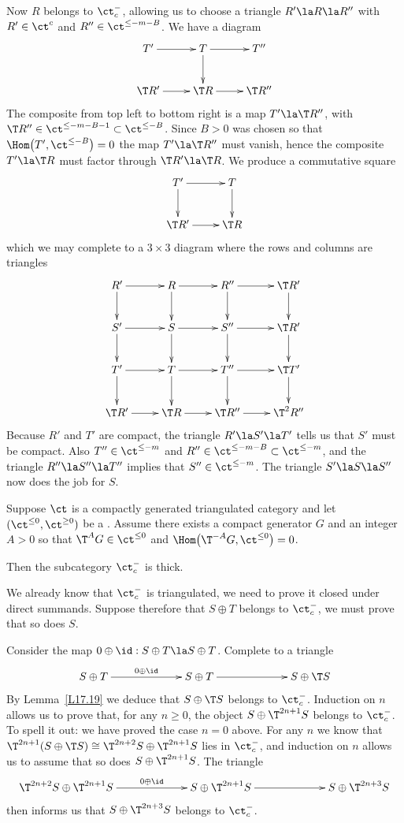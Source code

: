 \documentclass[11pt]{amsart}
\begin{document}
Now $R$ belongs to $\ct^-_c$, allowing us to choose a triangle $R'\la
R\la R''$ with 
$R'\in\ct^c$ and $R''\in\ct^{\leq-m-B}$. We have a diagram
\[\xymatrix{
T'\ar[r] & T\ar[r] \ar[d] & T'' \\
\T R' \ar[r] & \T R\ar[r]  &\T R''
}\]
The composite from top left to bottom right is a map $T'\la \T R''$,
with $\T R''\in\ct^{\leq-m-B-1}\subset\ct^{\leq-B}$. Since
$B>0$ was chosen so that $\Hom\big(T',\ct^{\leq-B}\big)=0$ the map
$T'\la\T R''$ must vanish, hence the composite $T'\la \T R$ must factor
through $\T R'\la\T R$. We produce a commutative
square
\[\xymatrix{
T'\ar[r]\ar[d] & T \ar[d] \\
\T R' \ar[r] & \T R
}\]
which we may complete to a $3\times3$ diagram where the rows and
columns are triangles
\[\xymatrix{
R' \ar[r] \ar[d] & R\ar[r]  \ar[d] & R''\ar[r] \ar[d] &\T R' \ar[d] \\
S' \ar[r] \ar[d] & S\ar[r]  \ar[d] & S''\ar[r] \ar[d] &\T R' \ar[d] \\
T'\ar[r] \ar[d] & T\ar[r] \ar[d] & T'' \ar[r]\ar[d]  &\T T' \ar[d] \\
\T R' \ar[r] & \T R\ar[r]  &\T R''\ar[r]  &\T^2 R''
}\]
Because $R'$ and $T'$ are compact, the triangle $R'\la S'\la T'$
tells us that $S'$ must be compact. Also
$T''\in\ct^{\leq-m}$ and $R''\in\ct^{\leq-m-B}\subset\ct^{\leq-m}$,
and the triangle $R''\la S''\la T''$ implies that
$S''\in\ct^{\leq-m}$.
The triangle $S'\la S\la S''$ now does the job for $S$.
\eprf




Suppose $\ct$ is a compactly generated triangulated category
 and
let $(\ct^{\leq0},\ct^{\geq0})$ be a \tstr.
Assume there
exists a compact generator $G$ and an integer $A>0$ so that
$\T^AG\in\ct^{\leq0}$ and $\Hom\big(\T^{-A}G,\ct^{\leq0}\big)=0$.

Then the subcategory $\ct^-_c$ is thick.
\epro


\prf
We already know that $\ct^-_c$
is triangulated, we need to prove it
closed under direct summands. Suppose
therefore that $S\oplus T$ belongs to $\ct^-_c$, we must prove that
so does $S$.

Consider the map $0\oplus\id:S\oplus T\la S\oplus T$. Complete to
a triangle
\[\xymatrix@C+40pt{
S\oplus T\ar[r]^-{0\oplus\id} & S\oplus T \ar[r] & S\oplus\T S
}\]
By Lemma~\ref{L17.19} we deduce that $S\oplus\T S$ belongs to $\ct^-_c$.
Induction on $n$ allows us to prove that, for any $n\geq0$,
the object $S\oplus\T^{2n+1} S$
belongs to $\ct^-_c$. To spell it out: we
have proved the case $n=0$ above.
For any $n$ we know that $\T^{2n+1}(S\oplus\T S)\cong\T^{2n+2}S\oplus\T^{2n+1}S$
lies in $\ct^-_c$, and induction on $n$ allows us to assume that so
does $S\oplus \T^{2n+1}S$.
The triangle
\[\xymatrix@C+40pt{
  \T^{2n+2}S\oplus \T^{2n+1}S \ar[r]^-{0\oplus\id} & S\oplus \T^{2n+1}S \ar[r] &
  S\oplus\T^{2n+3} S
}\]
then informs us that $S\oplus\T^{2n+3} S$ belongs to $\ct^-_c$.
\end{document}
